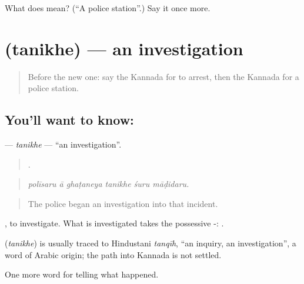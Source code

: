 \begin{tcolorbox}[breakable,colback=teal!4,colframe=teal!35!black,title={Before you move on}]
What does  mean? (\textquotedblleft{}A police station\textquotedblright{}.) Say it once more.
\end{tcolorbox}
\section[\texorpdfstring{\kn{ತನಿಖೆ} (tanikhe)}{ತನಿಖೆ (tanikhe)}]{ (tanikhe) — an investigation}

\label{lesson:KA-C323-tanikhe}



\begin{quote}
Before the new one: say the Kannada for to arrest, then the Kannada for a police station.
\end{quote}

\subsection*{You'll want to know: }
\textbf{} — \emph{tanikhe} — \textquotedblleft{}an investigation\textquotedblright{}.

\begin{quote}
     .
\end{quote}

\begin{quote}
\emph{polīsaru ā ghaṭaneya tanikhe śuru māḍidaru.}
\end{quote}

\begin{quote}
The police began an investigation into that incident.
\end{quote}

 , to investigate. What is investigated takes the possessive -:  .

\begin{cousinweb}
\textbf{} (\emph{tanikhe}) is usually traced to Hindustani \emph{tanqīh}, \textquotedblleft{}an inquiry, an investigation\textquotedblright{}, a word of Arabic origin; the path into Kannada is not settled.
\end{cousinweb}

\begin{grammarlens}[title={What you've built}]
One more word for telling what happened.
\end{grammarlens}

